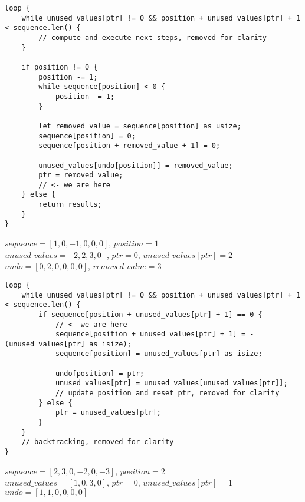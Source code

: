\begin{frame}[fragile]
    \begin{verbatim}
loop {
    while unused_values[ptr] != 0 && position + unused_values[ptr] + 1 < sequence.len() {
        // compute and execute next steps, removed for clarity
    }
    
    if position != 0 {
        position -= 1;
        while sequence[position] < 0 {
            position -= 1;
        }
        
        let removed_value = sequence[position] as usize;
        sequence[position] = 0;
        sequence[position + removed_value + 1] = 0;
        
        unused_values[undo[position]] = removed_value;
        ptr = removed_value;
        // <- we are here
    } else {
        return results;
    }
}
    \end{verbatim}
    $sequence = [1, 0, -1, 0, 0, 0]$, $position = 1$\\
    $unused\_values = [2, 2, 3, 0]$, $ptr = 0$, $unused\_values[ptr] = 2$\\
    $undo = [0, 2, 0, 0, 0, 0]$, $removed\_value = 3$
\end{frame}
\begin{frame}[fragile]
    \begin{verbatim}
loop {
    while unused_values[ptr] != 0 && position + unused_values[ptr] + 1 < sequence.len() {
        if sequence[position + unused_values[ptr] + 1] == 0 {
            // <- we are here
            sequence[position + unused_values[ptr] + 1] = -(unused_values[ptr] as isize);
            sequence[position] = unused_values[ptr] as isize;

            undo[position] = ptr;
            unused_values[ptr] = unused_values[unused_values[ptr]];
            // update position and reset ptr, removed for clarity
        } else {
            ptr = unused_values[ptr];
        }
    }
    // backtracking, removed for clarity
}
    \end{verbatim}
    $sequence = [2, 3, 0, -2, 0, -3]$, $position = 2$\\
    $unused\_values = [1, 0, 3, 0]$, $ptr = 0$, $unused\_values[ptr] = 1$\\
    $undo = [1, 1, 0, 0, 0, 0]$
\end{frame}
